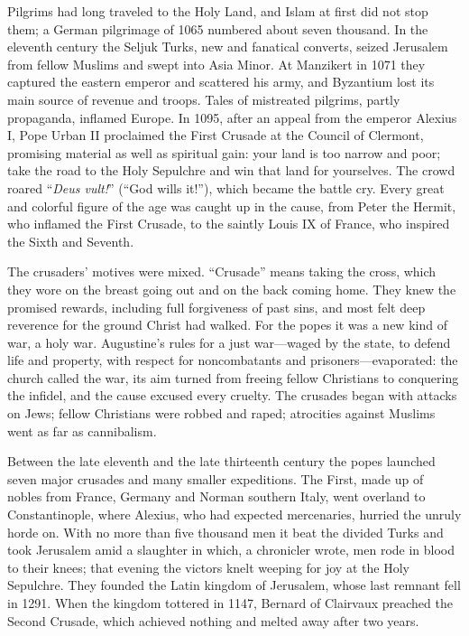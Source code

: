 Pilgrims had long traveled to the Holy Land, and Islam at first did not stop them; a German
pilgrimage of 1065 numbered about seven thousand. In the eleventh century the Seljuk Turks, new and
fanatical converts, seized Jerusalem from fellow Muslims and swept into Asia Minor. At Manzikert in
1071 they captured the eastern emperor and scattered his army, and Byzantium lost its main source of
revenue and troops. Tales of mistreated pilgrims, partly propaganda, inflamed Europe. In 1095, after
an appeal from the emperor Alexius I, Pope Urban II proclaimed the First Crusade at the Council of
Clermont, promising material as well as spiritual gain: your land is too narrow and poor; take the
road to the Holy Sepulchre and win that land for yourselves. The crowd roared ``\emph{Deus vult!}''
(``God wills it!''), which became the battle cry. Every great and colorful figure of the age was caught
up in the cause, from Peter the Hermit, who inflamed the First Crusade, to the saintly Louis IX of
France, who inspired the Sixth and Seventh.

The crusaders' motives were mixed. ``Crusade'' means taking the cross, which they wore on the breast
going out and on the back coming home. They knew the promised rewards, including full forgiveness of
past sins, and most felt deep reverence for the ground Christ had walked. For the popes it was a new
kind of war, a holy war. Augustine's rules for a just war---waged by the state, to defend life and
property, with respect for noncombatants and prisoners---evaporated: the church called the war, its
aim turned from freeing fellow Christians to conquering the infidel, and the cause excused every
cruelty. The crusades began with attacks on Jews; fellow Christians were robbed and raped; atrocities
against Muslims went as far as cannibalism.

Between the late eleventh and the late thirteenth century the popes launched seven major crusades and
many smaller expeditions. The First, made up of nobles from France, Germany and Norman southern Italy,
went overland to Constantinople, where Alexius, who had expected mercenaries, hurried the unruly
horde on. With no more than five thousand men it beat the divided Turks and took Jerusalem amid a
slaughter in which, a chronicler wrote, men rode in blood to their knees; that evening the victors
knelt weeping for joy at the Holy Sepulchre. They founded the Latin kingdom of Jerusalem, whose last
remnant fell in 1291. When the kingdom tottered in 1147, Bernard of Clairvaux preached the Second
Crusade, which achieved nothing and melted away after two years.

